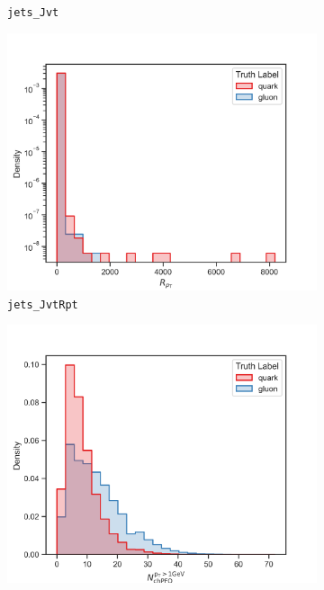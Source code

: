 \begin{figure}[!htb]
\begin{subfigure}[t]{0.48\textwidth}
		\caption{\texttt{jets\_Jvt}}
		\label{fig:highlevel_13}
	\end{subfigure}
	\begin{subfigure}[t]{0.48\textwidth}
		\includegraphics[width=1\textwidth]{src/plots/distributions/highlevel/jets_JvtRpt.png}
		\caption{\texttt{jets\_JvtRpt}}
		\label{fig:highlevel_14}
	\end{subfigure}
	\begin{subfigure}[t]{0.48\textwidth}
		\includegraphics[width=1\textwidth]{src/plots/distributions/highlevel/jets_NumChargedPFOPt1000[0].png}

\end{subfigure}
\end{figure}
